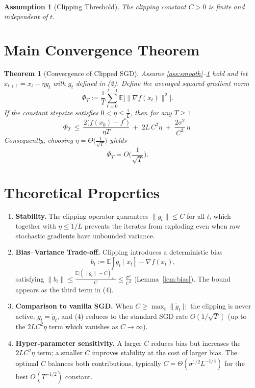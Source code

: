 \documentclass[11pt]{article}
\newtheorem{theorem}{Theorem}
\newtheorem{assumption}{Assumption}
\newcommand{\E}{\mathbb{E}}
\begin{document}
\begin{assumption}[Clipping Threshold]\label{ass:clip}
The clipping constant $C>0$ is finite and independent of $t$.
\end{assumption}

\section*{Main Convergence Theorem}
\begin{theorem}[Convergence of Clipped SGD]\label{thm:main}
Assume \ref{ass:smooth}–\ref{ass:clip} hold and let $x_{t+1}=x_t-\eta g_t$ with $g_t$ defined in (2).  
Define the averaged squared gradient norm
\[
\Phi_T:=\frac{1}{T}\sum_{t=0}^{T-1}\E\big[\|\nabla f(x_t)\|^{2}\big].
\]
If the constant stepsize satisfies $0<\eta\le\frac{1}{L}$, then for any $T\ge1$
\[
\Phi_T\ \le\ \frac{2\big(f(x_0)-f^*\big)}{\eta T}
\;+\;2L\,C^{2}\eta\;+\;\frac{2\sigma^{2}}{C^{2}}\,\eta .
\tag{4}
\]
Consequently, choosing $\eta=\Theta\!\big(\frac{1}{\sqrt{T}}\big)$ yields
\[
\Phi_T = O\!\Big(\frac{1}{\sqrt{T}}\Big).
\]
\end{theorem}

\section*{Theoretical Properties}
\begin{enumerate}[label=\arabic*.]
\item \textbf{Stability.} The clipping operator guarantees $\|g_t\|\le C$ for all $t$, which together with $\eta\le 1/L$ prevents the iterates from exploding even when raw stochastic gradients have unbounded variance.
\item \textbf{Bias–Variance Trade‑off.} Clipping introduces a deterministic bias
\[
b_t:=\E[g_t\mid x_t]-\nabla f(x_t),
\]
satisfying $\|b_t\|\le \frac{\E\big[(\|\tilde g_t\|-C)_{+}^{2}\big]}{C}\le \frac{\sigma^{2}}{C^{2}}$ (Lemma~\ref{lem:bias}). The bound appears as the third term in (4).
\item \textbf{Comparison to vanilla SGD.} When $C\ge \max_t\|\tilde g_t\|$ the clipping is never active, $g_t=\tilde g_t$, and (4) reduces to the standard SGD rate $O(1/\sqrt{T})$ (up to the $2LC^{2}\eta$ term which vanishes as $C\to\infty$).
\item \textbf{Hyper‑parameter sensitivity.} A larger $C$ reduces bias but increases the $2LC^{2}\eta$ term; a smaller $C$ improves stability at the cost of larger bias. The optimal $C$ balances both contributions, typically $C=\Theta(\sigma^{1/2}L^{-1/4})$ for the best $O(T^{-1/2})$ constant.
\end{enumerate}
\end{document}
